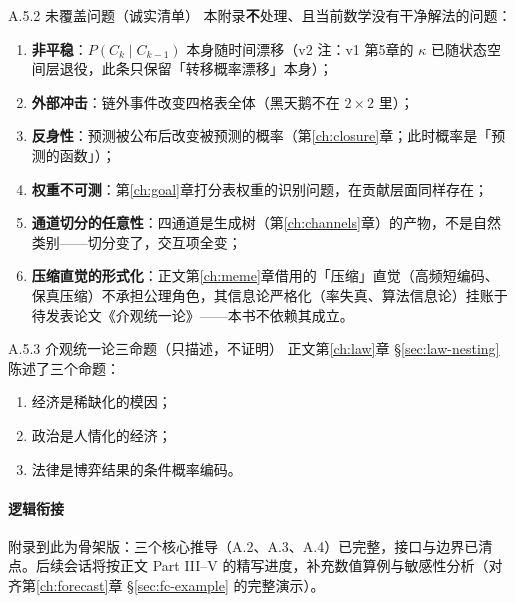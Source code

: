 \documentclass[../../main2.tex]{subfiles}
\begin{document}
	\begin{mathbox}{A.5.2 未覆盖问题（诚实清单）}
		本附录\textbf{不}处理、且当前数学没有干净解法的问题：
		\begin{enumerate}
			\item \textbf{非平稳}：$P(C_k \mid C_{k-1})$ 本身随时间漂移（v2 注：v1 第5章的 $\kappa$ 已随状态空间层退役，此条只保留「转移概率漂移」本身）；
			\item \textbf{外部冲击}：链外事件改变四格表全体（黑天鹅不在 $2\times2$ 里）；
			\item \textbf{反身性}：预测被公布后改变被预测的概率（第\ref{ch:closure}章；此时概率是「预测的函数」）；
			\item \textbf{权重不可测}：第\ref{ch:goal}章打分表权重的识别问题，在贡献层面同样存在；
			\item \textbf{通道切分的任意性}：四通道是生成树（第\ref{ch:channels}章）的产物，不是自然类别——切分变了，交互项全变；
			\item \textbf{压缩直觉的形式化}：正文第\ref{ch:meme}章借用的「压缩」直觉（高频短编码、保真压缩）不承担公理角色，其信息论严格化（率失真、算法信息论）挂账于待发表论文《介观统一论》——本书不依赖其成立。
		\end{enumerate}
	\end{mathbox}

	\begin{mathbox}{A.5.3 介观统一论三命题（只描述，不证明）}
		正文第\ref{ch:law}章 §\ref{sec:law-nesting} 陈述了三个命题：
		\begin{enumerate}
			\item 经济是稀缺化的模因；
			\item 政治是人情化的经济；
			\item 法律是博弈结果的条件概率编码。
		\end{enumerate}
	\end{mathbox}

	\paragraph*{逻辑衔接}
	附录到此为骨架版：三个核心推导（A.2、A.3、A.4）已完整，接口与边界已清点。后续会话将按正文 Part III--V 的精写进度，补充数值算例与敏感性分析（对齐第\ref{ch:forecast}章 §\ref{sec:fc-example} 的完整演示）。
\end{document}
